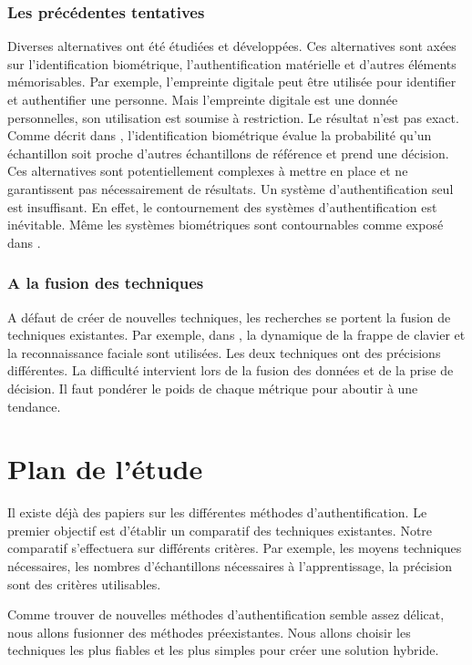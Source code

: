 \documentclass[conference,compsoc]{IEEEtran}
\begin{document}
\subsubsection{Les précédentes tentatives}

Diverses alternatives ont été étudiées et développées. Ces alternatives sont axées sur l'identification biométrique, l'authentification matérielle et d'autres éléments mémorisables. Par exemple, l'empreinte digitale peut être utilisée pour identifier et authentifier une personne. Mais l'empreinte digitale est une donnée personnelles, son utilisation est soumise à restriction. Le résultat n'est pas exact. Comme décrit dans \cite{10.1109/MC.2012.364} , l'identification biométrique évalue la probabilité qu'un échantillon soit proche d'autres échantillons de référence et prend une décision. Ces alternatives sont potentiellement complexes à mettre en place et ne garantissent pas nécessairement de résultats. Un système d'authentification seul est insuffisant. En effet, le contournement des systèmes d'authentification est inévitable. Même les systèmes biométriques sont contournables comme exposé dans \cite{duc2009your}.

\subsubsection{A la fusion des techniques}

A défaut de créer de nouvelles techniques, les recherches se portent la fusion de techniques existantes. Par exemple, dans \cite{7371386}, la dynamique de la frappe de clavier et la reconnaissance faciale sont utilisées. Les deux techniques ont des précisions différentes. La difficulté intervient lors de la fusion des données et de la prise de décision. Il faut pondérer le poids de chaque métrique pour aboutir à une tendance.

\section{Plan de l'étude}

Il existe déjà des papiers sur les différentes méthodes d'authentification.
Le premier objectif est d'établir un comparatif des techniques existantes. Notre comparatif s'effectuera sur différents critères. Par exemple, les moyens techniques nécessaires, les nombres d'échantillons nécessaires à l'apprentissage, la précision sont des critères utilisables.

Comme trouver de nouvelles méthodes d'authentification semble assez délicat, nous allons fusionner des méthodes préexistantes. Nous allons choisir les techniques les plus fiables et les plus simples pour créer une solution hybride.
\end{document}
